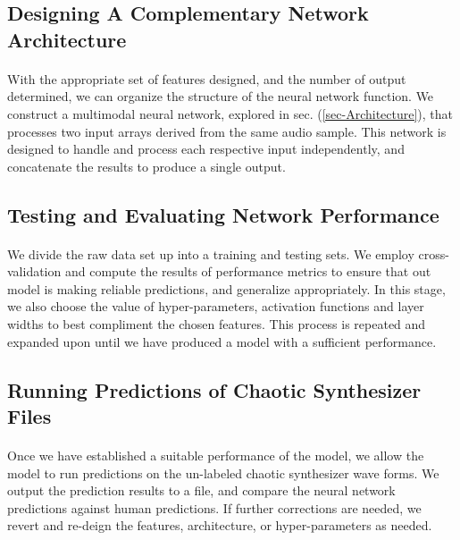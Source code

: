 \documentclass[12pt,letterpaper]{article}
\begin{document}
\subsection{Designing A Complementary Network Architecture}

\paragraph*{}With the appropriate set of features designed, and the number of output determined, we can organize the structure of the neural network function. We construct a multimodal neural network, explored in sec. (\ref{sec-Architecture}), that processes two input arrays derived from the same audio sample. This network is designed to handle and process each respective input independently, and concatenate the results to produce a single output. 


\subsection{Testing and Evaluating Network Performance}

\paragraph*{}We divide the raw data set up into a training and testing sets. We employ cross-validation and compute the results of performance metrics to ensure that out model is making reliable predictions, and generalize appropriately. In this stage, we also choose the value of hyper-parameters, activation functions and layer widths to best compliment the chosen features. This process is repeated and expanded upon until we have produced a model with a sufficient performance.


\subsection{Running Predictions of Chaotic Synthesizer Files}

\paragraph*{}Once we have established a suitable performance of the model, we allow the model to run predictions on the un-labeled chaotic synthesizer wave forms. We output the prediction results to a file, and compare the neural network predictions against human predictions. If further corrections are needed, we revert and re-deign the features, architecture, or hyper-parameters as needed.
\end{document}
